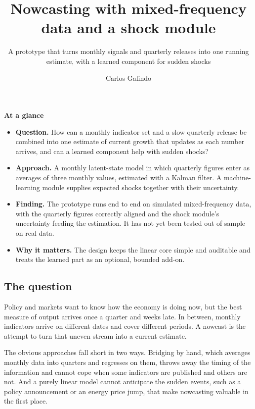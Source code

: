 \documentclass[
  british,
  a4paper,
]{article}
\title{Nowcasting with mixed-frequency data and a shock module}
\subtitle{A prototype that turns monthly signals and quarterly releases
into one running estimate, with a learned component for sudden shocks}
\author{Carlos Galindo}
\date{}
\providecommand{\tightlist}{%
  \setlength{\itemsep}{0pt}\setlength{\parskip}{0pt}}
\begin{document}
\maketitle


\begin{tcolorbox}[enhanced jigsaw, arc=.35mm, bottomrule=.15mm, breakable, colback=white, colframe=quarto-callout-note-color-frame, left=2mm, leftrule=.75mm, opacityback=0, rightrule=.15mm, toprule=.15mm]

\vspace{-3mm}\textbf{At a glance}\vspace{3mm}

\begin{itemize}
\tightlist
\item
  \textbf{Question.} How can a monthly indicator set and a slow
  quarterly release be combined into one estimate of current growth that
  updates as each number arrives, and can a learned component help with
  sudden shocks?
\item
  \textbf{Approach.} A monthly latent-state model in which quarterly
  figures enter as averages of three monthly values, estimated with a
  Kalman filter. A machine-learning module supplies expected shocks
  together with their uncertainty.
\item
  \textbf{Finding.} The prototype runs end to end on simulated
  mixed-frequency data, with the quarterly figures correctly aligned and
  the shock module's uncertainty feeding the estimation. It has not yet
  been tested out of sample on real data.
\item
  \textbf{Why it matters.} The design keeps the linear core simple and
  auditable and treats the learned part as an optional, bounded add-on.
\end{itemize}

\end{tcolorbox}

\subsection{The question}\label{the-question}

Policy and markets want to know how the economy is doing now, but the
best measure of output arrives once a quarter and weeks late. In
between, monthly indicators arrive on different dates and cover
different periods. A nowcast is the attempt to turn that uneven stream
into a current estimate.

The obvious approaches fall short in two ways. Bridging by hand, which
averages monthly data into quarters and regresses on them, throws away
the timing of the information and cannot cope when some indicators are
published and others are not. And a purely linear model cannot
anticipate the sudden events, such as a policy announcement or an energy
price jump, that make nowcasting valuable in the first place.
\end{document}
